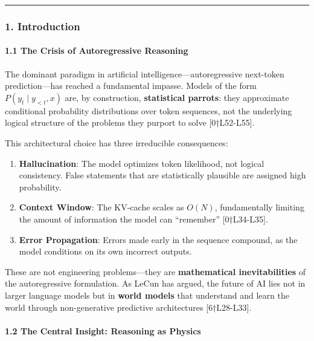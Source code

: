 \documentclass[
  11pt,
  a4paper,
]{article}
\providecommand{\tightlist}{%
  \setlength{\itemsep}{0pt}\setlength{\parskip}{0pt}}
\begin{document}
\begin{center}\rule{0.5\linewidth}{0.5pt}\end{center}

\subsubsection{1. Introduction}\label{introduction-1}

\paragraph{1.1 The Crisis of Autoregressive
Reasoning}\label{the-crisis-of-autoregressive-reasoning}

The dominant paradigm in artificial intelligence---autoregressive
next-token prediction---has reached a fundamental impasse. Models of the
form \(P(y_t \mid y_{<t}, x)\) are, by construction, \textbf{statistical
parrots}: they approximate conditional probability distributions over
token sequences, not the underlying logical structure of the problems
they purport to solve {[}0†L52-L55{]}.

This architectural choice has three irreducible consequences:

\begin{enumerate}
\def\labelenumi{\arabic{enumi}.}
\tightlist
\item
  \textbf{Hallucination}: The model optimizes token likelihood, not
  logical consistency. False statements that are statistically plausible
  are assigned high probability.
\item
  \textbf{Context Window}: The KV-cache scales as \(O(N)\),
  fundamentally limiting the amount of information the model can
  ``remember'' {[}0†L34-L35{]}.
\item
  \textbf{Error Propagation}: Errors made early in the sequence
  compound, as the model conditions on its own incorrect outputs.
\end{enumerate}

These are not engineering problems---they are \textbf{mathematical
inevitabilities} of the autoregressive formulation. As LeCun has argued,
the future of AI lies not in larger language models but in \textbf{world
models} that understand and learn the world through non-generative
predictive architectures {[}6†L28-L33{]}.

\paragraph{1.2 The Central Insight: Reasoning as
Physics}\label{the-central-insight-reasoning-as-physics}
\end{document}
